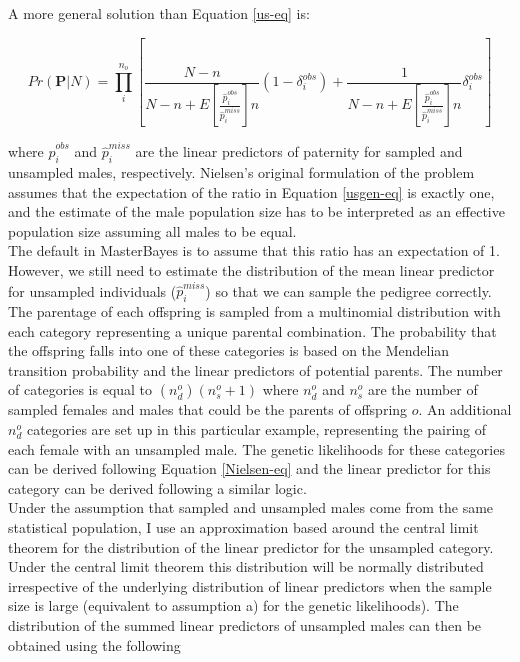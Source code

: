\documentclass{article}
\begin{document}
A more general solution than Equation \ref{us-eq} is: 

\begin{equation}
Pr(\bm{P}|N)  = \prod^{n_{o}}_{i}\left[\frac{N-n}{N-n+E\left[\frac{\hat{p}^{obs}_{i}}{\hat{p}^{miss}_{i}}\right]n}(1-\delta^{obs}_{i})+\frac{1}{N-n+E\left[\frac{\hat{p}^{obs}_{i}}{\hat{p}^{miss}_{i}}\right]n}\delta^{obs}_{i}\right]
\label{usgen-eq}
\end{equation}

where $\hat{p}^{obs}_{i}$ and $\hat{p}^{miss}_{i}$ are the linear predictors of paternity for sampled and unsampled males, respectively.  Nielsen's original formulation of the problem assumes that the expectation of the ratio in Equation \ref{usgen-eq} is exactly one, and the estimate of the male population size has to be interpreted as an effective population size assuming all males to be equal.\\

The default in MasterBayes is to assume that this ratio has an expectation of 1.  However, we still need to estimate the distribution of the mean linear predictor for unsampled individuals ($\hat{p}^{miss}_{i}$) so that we can sample the pedigree correctly.\\

The parentage of each offspring is sampled from a multinomial distribution with each category representing a unique parental combination.  The probability that the offspring falls into one of these categories is based on the Mendelian transition probability and the linear predictors of potential parents.  The number of categories is equal to $(n^{o}_{d})(n^{o}_{s}+1)$ where $n^{o}_{d}$ and $n^{o}_{s}$ are the number of sampled females and males that could be the parents of offspring $o$.  An additional $n^{o}_{d}$ categories are set up in this particular example, representing the pairing of each female with an unsampled male.  The genetic likelihoods for these categories can be derived following Equation \ref{Nielsen-eq} and the linear predictor for this category can be derived following a similar logic.\\   

 Under the assumption that sampled and unsampled males come from the same statistical population,  I use an approximation based around the central limit theorem for the distribution of the linear predictor for the unsampled category.  Under the central limit theorem this distribution will be normally distributed irrespective of the underlying distribution of linear predictors when the sample size is large (equivalent to assumption a) for the genetic likelihoods).  The distribution of the summed linear predictors of unsampled males can then be obtained using the following
\end{document}
